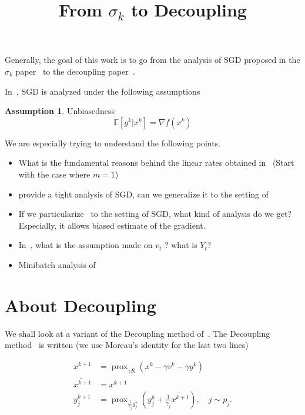 \documentclass{article}
\title{From $\sigma_k$ to Decoupling}
\DeclareMathOperator{\prox}{prox}
\newcommand{\bE}{{\mathbb E}}
\theoremstyle{definition}
\newtheorem{assumption}{Assumption}
\begin{document}
\maketitle

\begin{abstract} 

\end{abstract}

Generally, the goal of this work is to go from the analysis of SGD proposed in the $\sigma_k$ paper~\cite{gorbunov2019unified} to the decoupling paper~\cite{mishchenko2019stochastic}.

In~\cite{gorbunov2019unified}, SGD is analyzed under the following assumptions 
\begin{assumption}
Unbiasedness
\begin{equation}
    \bE[g^k|x^k] = \nabla f(x^k)
\end{equation}
\end{assumption}

We are especially trying to understand the following points.
\begin{itemize}
    \item What is the fundamental reasons behind the linear rates obtained in~\cite{mishchenko2019stochastic} (Start with the case where $m=1$)
    \item \cite{gorbunov2019unified} provide a tight analysis of SGD, can we generalize it to the setting of~\cite{mishchenko2019stochastic}
    \item If we particularize~\cite{mishchenko2019stochastic} to the setting of SGD, what kind of analysis do we get? Especially, it allows biased estimate of the gradient.
    \item In~\cite{mishchenko2019stochastic}, what is the assumption made on $v_t$ ? what is $Y_t$?
    \item Minibatch analysis of~\cite{mishchenko2019stochastic} 
\end{itemize}
\section{About Decoupling}
We shall look at a variant of the Decoupling method of~\cite{mishchenko2019stochastic}.
The Decoupling method~\cite{mishchenko2019stochastic} is written (we use Moreau's identity for the last two lines)

\begin{align}
    x^{k+1}   &= \prox_{\gamma R}(x^k - \gamma v^k - \gamma y^k)\\
    \widetilde{x^{k+1}} &= x^{k+1}\\
    y_j^{k+1} &= \prox_{\frac{1}{\gamma_j} g_j^\star}(y_j^k + \frac{1}{\gamma_j}\widetilde{x^{k+1}} ), \quad j \sim p_j.
\end{align}
\end{document}
